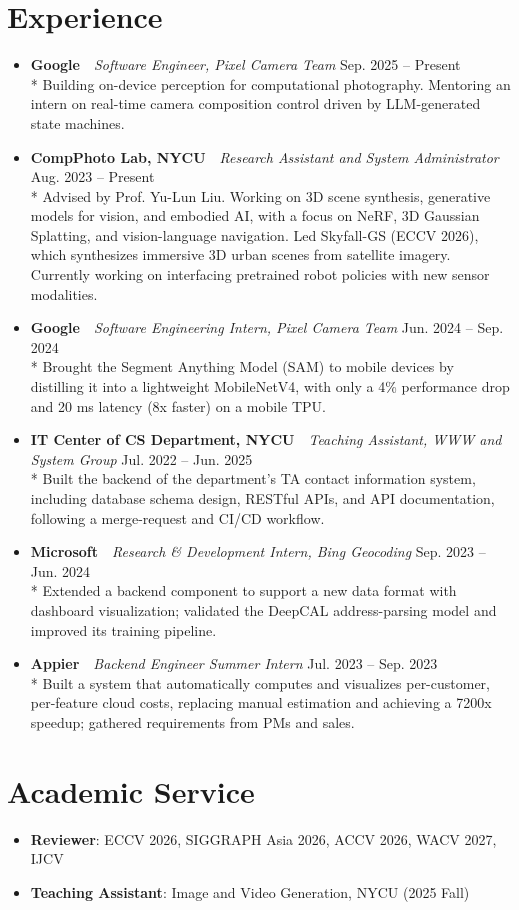 \documentclass[a4paper,10pt]{extarticle}
\newenvironment{cvlist}
  {\begin{itemize}[leftmargin=1em, itemsep=2pt, topsep=0pt, parsep=0pt, label=\textbullet]}
  {\end{itemize}}
\newcommand{\exper}[4]{%
  \item \textbf{#1} \,\textendash\, \textit{#2} \hfill #3\\*
  #4}
\newcommand{\cvitem}[2]{\item \textbf{#1}: #2}
\begin{document}
\section{Experience}
\begin{cvlist}
\exper{Google}{Software Engineer, Pixel Camera Team}{Sep. 2025 -- Present}
  {Building on-device perception for computational photography. Mentoring an intern on real-time camera composition control driven by LLM-generated state machines.}

\exper{CompPhoto Lab, NYCU}{Research Assistant and System Administrator}{Aug. 2023 -- Present}
  {Advised by Prof. Yu-Lun Liu. Working on 3D scene synthesis, generative models for vision, and embodied AI, with a focus on NeRF, 3D Gaussian Splatting, and vision-language navigation. Led Skyfall-GS (ECCV 2026), which synthesizes immersive 3D urban scenes from satellite imagery. Currently working on interfacing pretrained robot policies with new sensor modalities.}

\exper{Google}{Software Engineering Intern, Pixel Camera Team}{Jun. 2024 -- Sep. 2024}
  {Brought the Segment Anything Model (SAM) to mobile devices by distilling it into a lightweight MobileNetV4, with only a 4\% performance drop and 20 ms latency (8x faster) on a mobile TPU.}

\exper{IT Center of CS Department, NYCU}{Teaching Assistant, WWW and System Group}{Jul. 2022 -- Jun. 2025}
  {Built the backend of the department's TA contact information system, including database schema design, RESTful APIs, and API documentation, following a merge-request and CI/CD workflow.}

\exper{Microsoft}{Research \& Development Intern, Bing Geocoding}{Sep. 2023 -- Jun. 2024}
  {Extended a backend component to support a new data format with dashboard visualization; validated the DeepCAL address-parsing model and improved its training pipeline.}

\exper{Appier}{Backend Engineer Summer Intern}{Jul. 2023 -- Sep. 2023}
  {Built a system that automatically computes and visualizes per-customer, per-feature cloud costs, replacing manual estimation and achieving a 7200x speedup; gathered requirements from PMs and sales.}

\end{cvlist}

\section{Academic Service}
\begin{cvlist}
\cvitem{Reviewer}{ECCV 2026, SIGGRAPH Asia 2026, ACCV 2026, WACV 2027, IJCV}
\cvitem{Teaching Assistant}{Image and Video Generation, NYCU (2025 Fall)}
\end{cvlist}
\end{document}
